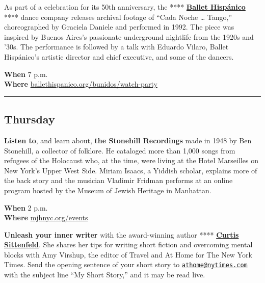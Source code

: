 As part of a celebration for its 50th anniversary, the ****
\textbf{\href{https://www.nytimes.com/2019/11/24/arts/dance/ballet-hispanico-review.html}{Ballet
Hispánico}} **** dance company releases archival footage of ``Cada Noche
\ldots{} Tango,'' choreographed by Graciela Daniele and performed in
1992. The piece was inspired by Buenos Aires's passionate underground
nightlife from the 1920s and '30s. The performance is followed by a talk
with Eduardo Vilaro, Ballet Hispánico's artistic director and chief
executive, and some of the dancers.

\textbf{When} 7 p.m.\\
\textbf{Where}
\href{http://r20.rs6.net/tn.jsp?f=001_OFfEphF10YZ0-xbGzNCumLortXyKLcRheOhwr0XLWtvahF7bSg32WekAkesfMsmNiMlfbgkcfdvMW9kj5G5jo6vqo9r4Q_2KntBZsbwGWrT4V4mfOq6iRLIGwqAaR35sRgWiaFm__ou0GAnhiJIJhvAOkwN-Aef-v_jr14ojl6dyO1I3g6Oje3wSlCUlVf5p5r2vUqCg11WNXY5jri_NA==\&c=kJatXI4cJaEJSfIoW6aZUvG23ITP-YMH-FZGBLLT4aZqaYX8iL1bGg==\&ch=jtv5g6Fw5AS-c0CZDIngHS4580VSgllMogfK8wt_zmrBMvScABCZyA==}{ballethispanico.org/bunidos/watch-party}

\begin{center}\rule{0.5\linewidth}{\linethickness}\end{center}

\hypertarget{thursday}{%
\subsection{Thursday}\label{thursday}}

\textbf{Listen to}, and learn about, \textbf{the Stonehill Recordings}
made in 1948 by Ben Stonehill, a collector of folklore. He cataloged
more than 1,000 songs from refugees of the Holocaust who, at the time,
were living at the Hotel Marseilles on New York's Upper West Side.
Miriam Isaacs, a Yiddish scholar, explains more of the back story and
the musician Vladimir Fridman performs at an online program hosted by
the Museum of Jewish Heritage in Manhattan.

\textbf{When} 2 p.m.\\
\textbf{Where}
\href{https://mjhnyc.org/events/survivor-songs-amazing-stonehill-recordings/}{mjhnyc.org/events}

\textbf{Unleash your inner writer} with the award-winning author ****
\textbf{\href{https://www.nytimes.com/2020/07/18/at-home/coronavirus-fiction-writing.html}{Curtis
Sittenfeld}}. She shares her tips for writing short fiction and
overcoming mental blocks with Amy Virshup, the editor of Travel and At
Home for The New York Times. Send the opening sentence of your short
story to
\href{mailto:athome@nytimes.com}{\nolinkurl{athome@nytimes.com}} with
the subject line ``My Short Story,'' and it may be read live.

